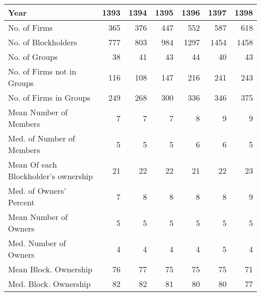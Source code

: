 \begin{tabular}{lrrrrrr}
\toprule
Year &  1393 &  1394 &  1395 &  1396 &  1397 &  1398 \\
\midrule
No. of Firms                         &   365 &   376 &   447 &   552 &   587 &   618 \\
No. of Blockholders                  &   777 &   803 &   984 &  1297 &  1454 &  1458 \\
No. of Groups                        &    38 &    41 &    43 &    44 &    40 &    43 \\
No. of Firms not in Groups           &   116 &   108 &   147 &   216 &   241 &   243 \\
No. of Firms in Groups               &   249 &   268 &   300 &   336 &   346 &   375 \\
Mean Number of Members               &     7 &     7 &     7 &     8 &     9 &     9 \\
Med. of  Number of Members           &     5 &     5 &     5 &     6 &     6 &     5 \\
Mean Of each Blockholder’s ownership &    21 &    22 &    22 &    21 &    22 &    23 \\
Med. of Owners' Percent              &     7 &     8 &     8 &     8 &     8 &     9 \\
Mean Number of Owners                &     5 &     5 &     5 &     5 &     5 &     5 \\
Med. Number of Owners                &     4 &     4 &     4 &     4 &     5 &     4 \\
Mean Block. Ownership                &    76 &    77 &    75 &    75 &    75 &    71 \\
Med. Block. Ownership                &    82 &    82 &    81 &    80 &    80 &    77 \\
\bottomrule
\end{tabular}
